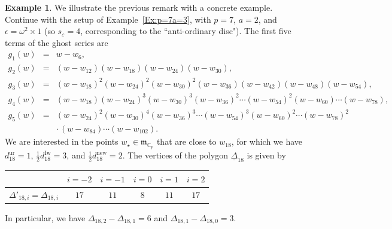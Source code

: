 \documentclass[12pt]{amsart}
\theoremstyle{definition}
\newtheorem{example}[subsection]{Example}
\numberwithin{equation}{subsection}
\def\gothm{\mathfrak{m}}
\def\CC{\mathbb{C}}
\newcommand{\Iw}{\mathrm{Iw}}
\newcommand{\unr}{\mathrm{ur}}
\begin{document}
\begin{example}
\label{Ex:near Steinberg}
We illustrate the previous remark with a concrete example.
Continue with the setup of Example~\ref{Ex:p=7a=3}, with $p=7$, $a=2$, and $\epsilon = \omega^2\times 1$ (so $s_\varepsilon =4$, corresponding to the ``anti-ordinary disc"). The first five terms of the ghost series are
\begin{eqnarray*}
g_1(w) &=& w-w_6,\\
g_2(w) &=& (w-w_{12})(w-w_{18})(w-w_{24})(w-w_{30}),\\
g_3(w) & =& (w-w_{18})^2(w-w_{24})^2(w-w_{30})^2(w-w_{36})(w-w_{42})(w-w_{48})(w-w_{54}),\\
g_4(w)&=& (w-w_{18})(w-w_{24})^3(w-w_{30})^3(w-w_{36})^2\cdots (w-w_{54})^2(w-w_{60})\cdots (w-w_{78}),\\
g_5(w)&=& (w-w_{24})^2(w-w_{30})^4(w-w_{36})^3\cdots (w-w_{54})^3(w-w_{60})^2\cdots (w-w_{78})^2\\
&&\cdot\,(w-w_{84})\cdots (w-w_{102}).
\end{eqnarray*}
We are interested in the points $w_\star \in \gothm_{\CC_p}$ that are close to $w_{18}$, for which we have $d_{18}^{\unr} = 1$, $\frac 12d_{18}^\Iw = 3$, and $\frac 12d_{18}^\mathrm{new} = 2$.
The vertices of the polygon $\underline \Delta_{18}$ is given by
\begin{center}\renewcommand{\arraystretch}{1.2}
\begin{tabular}{|c|c|c|c|c|c|}
\hline
& $i = -2$ & $i=-1$ & $i=0$ & $i=1$ & $i=2$
\\
\hline
$\Delta'_{18,i} = \Delta_{18,i}$ & $17$ & $11$ & $8$ & $11$ & $17$\\
\hline
\end{tabular}
\end{center}
In particular, we have $\Delta_{18, 2}- \Delta_{18,1} = 6$ and $\Delta_{18,1}-\Delta_{18,0} = 3$.


\end{example}
\end{document}
